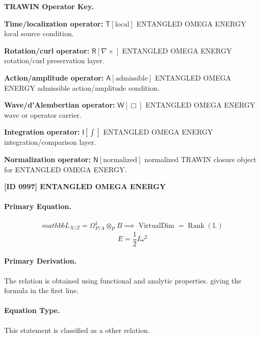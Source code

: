 \par\vspace{0.45\baselineskip}
\noindent\begin{minipage}[t]{\linewidth}
\begingroup
\small
\raggedright
\textbf{TRAWIN Operator Key.}\par
\noindent\textbf{Time/localization operator:} $\mathsf{T}\!\left[\mathrm{local}\right]$ ENTANGLED OMEGA ENERGY local source condition.\par
\noindent\textbf{Rotation/curl operator:} $\mathsf{R}\!\left[\nabla\times\right]$ ENTANGLED OMEGA ENERGY rotation/curl preservation layer.\par
\noindent\textbf{Action/amplitude operator:} $\mathsf{A}\!\left[\mathrm{admissible}\right]$ ENTANGLED OMEGA ENERGY admissible action/amplitude condition.\par
\noindent\textbf{Wave/d'Alembertian operator:} $\mathsf{W}\!\left[\Box\right]$ ENTANGLED OMEGA ENERGY wave or operator carrier.\par
\noindent\textbf{Integration operator:} $\mathsf{I}\!\left[\int\right]$ ENTANGLED OMEGA ENERGY integration/comparison layer.\par
\noindent\textbf{Normalization operator:} $\mathsf{N}\!\left[\mathrm{normalized}\right]$ normalized TRAWIN closure object for ENTANGLED OMEGA ENERGY.\par
\endgroup
\end{minipage}

\clearpage
\noindent\textbf{[ID 0997] ENTANGLED OMEGA ENERGY}\par
\vspace{0.35em}
\paragraph{Primary Equation.}
\[
mathbb{L}_{X/Z}=\Omega^{1}_{P/A}\otimes_{\mathrm{P}} B \implies \operatorname{VirtualDim}=\operatorname{Rank}(\mathbb{L})
\]
\[
E=\frac{1}{2}I\omega^{2}
\]

\paragraph{Primary Derivation.}
The relation is obtained using functional and analytic properties. giving the formula in the first line.
\paragraph{Equation Type.}
This statement is classified as a other relation.

